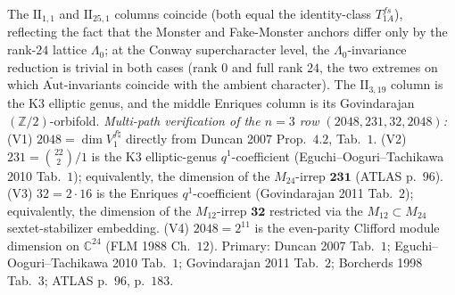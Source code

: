 \begin{remark}
\begin{center}
\end{center}
The $\mathrm{II}_{1,1}$ and $\mathrm{II}_{25,1}$ columns coincide
(both equal the identity-class $T^{fs}_{1A}$), reflecting the fact
that the Monster and Fake-Monster anchors differ only by the
rank-$24$ lattice $\Lambda_0$; at the Conway supercharacter level,
the $\Lambda_0$-invariance reduction is trivial in both cases (rank
$0$ and full rank $24$, the two extremes on which
$\widetilde{\mathrm{Aut}}$-invariants coincide with the ambient
character). The $\mathrm{II}_{3,19}$ column is the K3 elliptic genus,
and the middle Enriques column is its Govindarajan
$(\mathbb Z/2)$-orbifold.
\emph{Multi-path verification of the $n{=}3$ row
$(2048, 231, 32, 2048)$:}
(V1) $2048 = \dim V^{f\natural}_1$ directly from
Duncan 2007 Prop.~$4.2$, Tab.~$1$.
(V2) $231 = \binom{22}{2}/1$ is the K3 elliptic-genus $q^1$-coefficient
(Eguchi--Ooguri--Tachikawa 2010 Tab.~$1$); equivalently, the dimension
of the $M_{24}$-irrep $\mathbf{231}$ (ATLAS p.~$96$).
(V3) $32 = 2\cdot 16$ is the Enriques $q^1$-coefficient
(Govindarajan 2011 Tab.~$2$); equivalently, the dimension of the
$M_{12}$-irrep $\mathbf{32}$ restricted via the $M_{12}\subset M_{24}$
sextet-stabilizer embedding.
(V4) $2048 = 2^{11}$ is the even-parity Clifford module dimension
on $\mathbb{C}^{24}$ (FLM 1988 Ch.~$12$).
Primary: Duncan 2007 Tab.~$1$;
Eguchi--Ooguri--Tachikawa 2010 Tab.~$1$;
Govindarajan 2011 Tab.~$2$;
Borcherds 1998 Tab.~$3$;
ATLAS p.~$96$, p.~$183$.
\end{remark}

